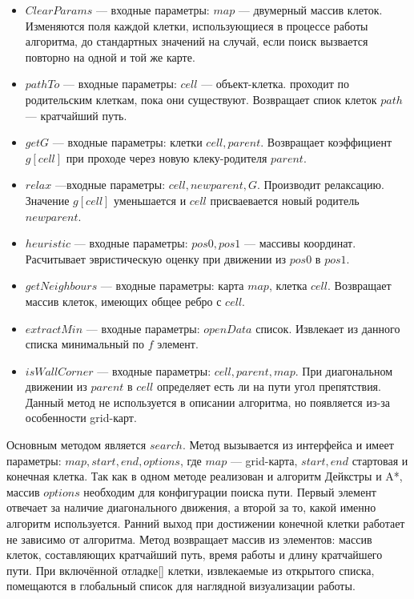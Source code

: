 \begin{itemize}
\item $ClearParams$ — входные параметры: $map$ — двумерный массив клеток. Изменяются поля каждой клетки, использующиеся в процессе работы алгоритма, до стандартных значений на случай, если поиск вызвается повторно на одной и той же карте.
\item $pathTo$ — входные параметры: $cell$ — объект-клетка. проходит по родительским клеткам, пока они существуют. Возвращает спиок клеток $path$ — кратчайший путь.
\item $getG$ — входные параметры: клетки $cell,parent$. Возвращает коэффициент $g[cell]$ при проходе через новую клеку-родителя $parent$.
\item $relax$ —входные параметры: $cell, newparent, G$. Производит релаксацию. Значение $g[cell]$ уменьшается и $cell$ присваевается новый родитель\\$newparent$.
\item $heuristic$ — входные параметры: $pos0, pos1$ — массивы координат. Расчитывает эвристическую оценку при движении из $pos0$ в $pos1$.
\item $getNeighbours$ — входные параметры: карта $map$, клетка $cell$. Возвращает массив клеток, имеющих общее ребро с $cell$.
\item $extractMin$ — входные параметры: $openData$ список. Извлекает из данного списка минимальный по $f$ элемент.
\item $isWallCorner$ — входные параметры: $cell,parent,map$. При диагональном движении из $parent$ в $cell$ определяет есть ли на пути угол препятствия. Данный метод не используется в описании алгоритма, но появляется из-за особенности grid-карт.
\end{itemize}

Основным методом является $search$. Метод вызывается из интерфейса и имеет параметры: $map, start, end, options$, где $map$ — grid-карта, $start, end$ стартовая и конечная клетка. Так как в одном методе реализован и алгоритм Дейкстры и A*, массив $options$ необходим для конфигурации поиска пути. Первый элемент отвечает за наличие диагонального движения, а второй за то, какой именно алгоритм используется. Ранний выход при достижении конечной клетки работает не зависимо от алгоритма. Метод возвращает массив из элементов: массив клеток, составляющих кратчайший путь, время работы и длину кратчайшего пути. При включённой отладке[] клетки, извлекаемые из открытого списка, помещаются в глобальный список для наглядной визуализации работы.

